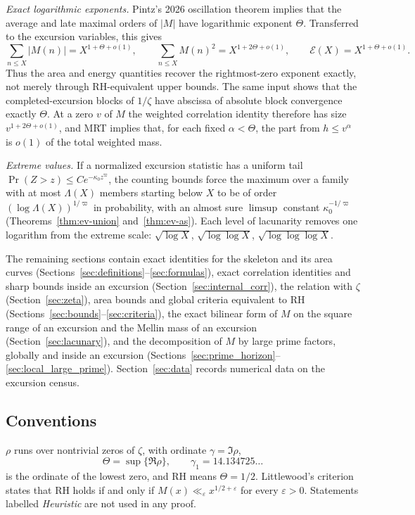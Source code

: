 \documentclass[11pt]{amsart}
\numberwithin{equation}{section}
\theoremstyle{plain}
\theoremstyle{definition}
\theoremstyle{remark}
\newcommand{\eps}{\varepsilon}
\newcommand{\En}{\mathcal{E}}
\begin{document}
\smallskip\noindent\emph{Exact logarithmic exponents.}
Pintz's 2026 oscillation theorem implies that the average and late maximal
orders of $|M|$ have logarithmic exponent $\Theta$.  Transferred to the
excursion variables, this gives
\[
 \sum_{n\le X}|M(n)|=X^{1+\Theta+o(1)},\qquad
 \sum_{n\le X}M(n)^2=X^{1+2\Theta+o(1)},\qquad
 \En(X)=X^{1+\Theta+o(1)}.
\]
Thus the area and energy quantities recover the rightmost-zero exponent
exactly, not merely through RH-equivalent upper bounds.  The same input
shows that the completed-excursion blocks of $1/\zeta$ have abscissa of
absolute block convergence exactly $\Theta$.  At a zero $v$ of $M$ the
weighted correlation identity therefore has size $v^{1+2\Theta+o(1)}$, and
MRT implies that, for each fixed $\alpha<\Theta$, the part from
$h\le v^\alpha$ is $o(1)$ of the total weighted mass.

\smallskip\noindent\emph{Extreme values.} If a normalized excursion statistic
has a uniform tail $\Pr(Z>z)\le Ce^{-\kappa_0z^\varpi}$, the counting bounds force the
maximum over a family with at most $\Lambda(X)$ members starting below $X$ to be
of order $(\log \Lambda(X))^{1/\varpi}$ in probability, with an almost sure $\limsup$ constant
$\kappa_0^{-1/\varpi}$ (Theorems~\ref{thm:ev-union} and~\ref{thm:ev-as}). Each level of
lacunarity removes one logarithm from the extreme scale:
$\sqrt{\log X}$, $\sqrt{\log\log X}$, $\sqrt{\log\log\log X}$.

\smallskip
The remaining sections contain exact identities for the skeleton and its area
curves (Sections~\ref{sec:definitions}--\ref{sec:formulas}), exact
correlation identities and sharp bounds inside an excursion
(Section~\ref{sec:internal_corr}), the relation with $\zeta$
(Section~\ref{sec:zeta}), area bounds and global criteria equivalent to RH
(Sections~\ref{sec:bounds}--\ref{sec:criteria}), the exact bilinear form of
$M$ on the square range of an excursion and the Mellin mass of an excursion
(Section~\ref{sec:lacunary}), and the decomposition of $M$ by large prime
factors, globally and inside an excursion
(Sections~\ref{sec:prime_horizon}--\ref{sec:local_large_prime}).
Section~\ref{sec:data} records numerical data on the excursion census.

\subsection*{Conventions}
$\rho$ runs over nontrivial zeros of $\zeta$, with ordinate $\gamma=\Im\rho$,
\[
\Theta=\sup\{\Re\rho\},\qquad \gamma_1=14.134725\ldots
\]
is the ordinate of the lowest zero, and RH means $\Theta=1/2$. Littlewood's
criterion \cite[\S14.25]{Titchmarsh1986} states that RH holds if and only if
$M(x)\ll_\eps x^{1/2+\eps}$ for every $\eps>0$. Statements labelled
\emph{Heuristic} are not used in any proof.
\end{document}

